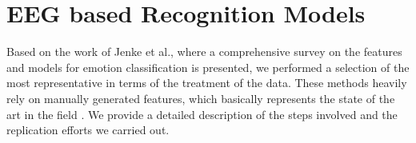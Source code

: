\documentclass{sig-alternate}
\begin{document}


	

\section{EEG based Recognition Models}
\label{methods}
	
Based on the work of Jenke et al.\cite{jenke2014feature}, where a 
comprehensive survey on  the features and models for emotion 
classification is presented, we performed a selection of the most 
representative in terms of the treatment of the data. These methods 
heavily rely on manually generated features, which basically represents 
the state of the art in the field \cite{}. We provide a detailed description 
of the steps involved and the replication efforts we carried out. 
\end{document}
